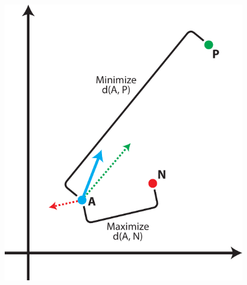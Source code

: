 \documentclass[aspectratio=169,10pt]{beamer}
\begin{document}
\begin{frame}
\begin{columns}[T]
        \begin{column}{0.4\textwidth}
            \centering
            \includegraphics[width=0.8\textwidth]{tripletloss_viz_vertical.pdf} %
        \end{column}
    \end{columns}
\end{frame}

    
    
            
\end{document}

